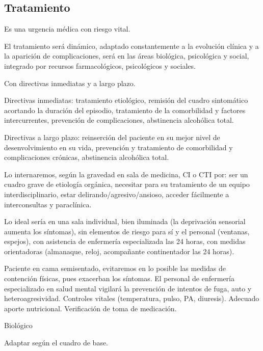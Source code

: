 \subsection*{Tratamiento}
Es una urgencia médica con riesgo vital.

El tratamiento será dinámico, adaptado constantemente a la evolución clínica y a la aparición de complicaciones, será en las áreas biológica, psicológica y social, integrado por recursos farmacológicos, psicológicos y sociales.

Con directivas inmediatas y a largo plazo.

Directivas inmediatas: tratamiento etiológico, remisión del cuadro sintomático acortando la duración del episodio, tratamiento de la comorbilidad y factores intercurrentes, prevención de complicaciones, abstinencia alcohólica total.

Directivas a largo plazo: reinserción del paciente en su mejor nivel de desenvolvimiento en su vida, prevención y tratamiento de comorbilidad y complicaciones crónicas, abstinencia alcohólica total.

Lo internaremos, según la gravedad en sala de medicina, CI o CTI por: ser un cuadro grave de etiología orgánica, necesitar para su tratamiento de un equipo interdisciplinario, estar delirando/agresivo/ansioso, acceder fácilmente a interconsultas y paraclínica.

Lo ideal sería en una sala individual, bien iluminada (la deprivación sensorial aumenta los síntomas), sin elementos de riesgo para sí y el personal (ventanas, espejos), con asistencia de enfermería especializada las 24 horas, con medidas orientadoras (almanaque, reloj, acompañante continentador las 24 horas).

Paciente en cama semisentado, evitaremos en lo posible las medidas de contención físicas, pues exacerban los síntomas. El personal de enfermería especializado en salud mental vigilará la prevención de intentos de fuga, auto y heteroagresividad. Controles vitales (temperatura, pulso, PA, diuresis). Adecuado aporte nutricional. Verificación de toma de medicación.

Biológico

Adaptar según el cuadro de base.
